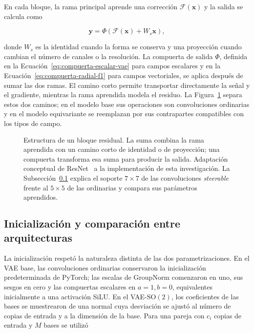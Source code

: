 En cada bloque, la rama principal aprende una corrección
\(\mathcal{F}(\mathbf{x})\) y la salida se calcula como

\begin{equation}
    \mathbf{y}=\Phi\!\left(\mathcal{F}(\mathbf{x})+W_s\mathbf{x}\right),
    \label{eq:bloque-residual}
\end{equation}

donde \(W_s\) es la identidad cuando la forma se conserva y una proyección
cuando cambian el número de canales o la resolución. La compuerta de salida
\(\Phi\), definida en la Ecuación~\eqref{eq:compuerta-escalar-vae}
para campos escalares y en la Ecuación~\eqref{eq:compuerta-radial-f1}
para campos vectoriales, se aplica después de sumar las
dos ramas. El camino corto permite
transportar directamente la señal y el gradiente, mientras la rama aprendida
modela el residuo. La Figura~\ref{fig:bloque-residual} separa estos dos caminos;
en el modelo base sus operaciones son convoluciones ordinarias y en el modelo
equivariante se reemplazan por sus contrapartes compatibles con los tipos de
campo.

\begin{figure}[htbp]
    \centering
    \resizebox{0.94\textwidth}{!}{}
    \caption[Estructura del bloque residual empleado.]{Estructura de un bloque residual. La suma combina la rama
    aprendida con un camino corto de identidad o de proyección; una compuerta
    transforma esa suma para producir la salida. Adaptación
    conceptual de ResNet~\cite{he_deep_2016} a la implementación de esta
    investigación. La Subsección~\ref{sec:comparacion-arquitecturas} explica el soporte
    \(7\times7\) de las convoluciones \emph{steerable} frente al
    \(5\times5\) de las ordinarias y compara sus parámetros aprendidos.}
    \label{fig:bloque-residual}
\end{figure}

\subsection{Inicialización y comparación entre arquitecturas}
\label{sec:comparacion-arquitecturas}

La inicialización respetó la naturaleza distinta de las dos parametrizaciones.
En el VAE base, las convoluciones ordinarias conservaron la inicialización
predeterminada de PyTorch; las escalas de GroupNorm comenzaron en uno, sus
sesgos en cero y las compuertas escalares en \(a=1,b=0\), equivalentes
inicialmente a una activación SiLU. En el VAE-\(\mathrm{SO}(2)\), los
coeficientes de las bases se muestrearon de una normal cuya desviación se
ajustó al número de copias de entrada y a la dimensión de la base. Para una
pareja con \(c_i\) copias de entrada y \(M\) bases se utilizó

